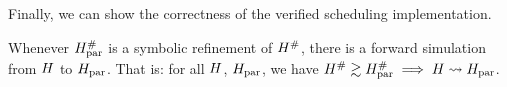 {Finally, we can show the correctness of the verified scheduling implementation.


\begin{theorem}\label{thm:scheduler-correctness}
  Whenever $H_\text{par}^{\#}$ is a symbolic refinement of $H^{\#}$, there is a forward simulation from $H$ to $H_\text{par}$. That is: for all $H$, $H_\text{par}$, we have $H^{\#} \gtrsim H_\text{par}^{\#} \implies H \mathrel{\leadsto} H_\text{par}$.


\end{theorem}}
